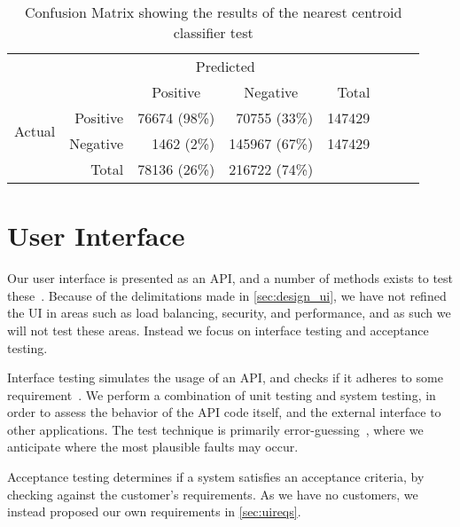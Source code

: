 \begin{table}[tbp]
    \centering
     \begin{tabular}{rrrrrrrr}
      \toprule
      \multicolumn{2}{c}{} & \multicolumn{2}{c}{Predicted} & \\
      \cmidrule{3-4}
      \multicolumn{2}{c}{} & \multicolumn{1}{c}{Positive} & \multicolumn{1}{c}{Negative} & Total \\
      \midrule
      \multirow{2}{*}{Actual} & Positive & \num{76674} (98\%) & \num{70755} (33\%)  & \num{147429} \\
                              & Negative & \num{1462} (2\%)  & \num{145967} (67\%) & \num{147429} \\
                              \cmidrule{1-2}
                              & Total    & \num{78136} (26\%) & \num{216722} (74\%) \\
      \bottomrule
    \end{tabular}
    \caption[Confusion Matrix]{Confusion Matrix showing the results of the nearest centroid classifier test}%
    \label{tab:confusionmatrix}
\end{table}

\section{User Interface}
Our user interface is presented as an API, and a number of methods exists to test these~\cite{swebok}. Because of the delimitations made in \cref{sec:design_ui}, we have not refined the UI in areas such as load balancing, security, and performance, and as such we will not test these areas. Instead we focus on interface testing and acceptance testing.

Interface testing simulates the usage of an API, and checks if it adheres to some requirement~\cite{swebok}. We perform a combination of unit testing and system testing, in order to assess the behavior of the API code itself, and the external interface to other applications. The test technique is primarily error-guessing~\cite{swebok}, where we anticipate where the most plausible faults may occur.

Acceptance testing determines if a system satisfies an acceptance criteria, by checking against the customer's requirements. As we have no customers, we instead proposed our own requirements in \cref{sec:uireqs}.


